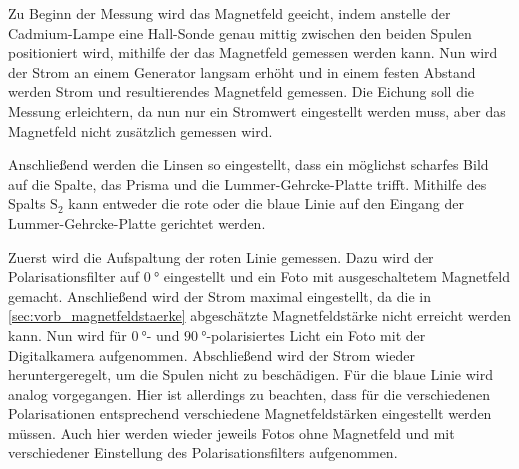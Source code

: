 Zu Beginn der Messung wird das Magnetfeld geeicht,
indem anstelle der Cadmium-Lampe eine Hall-Sonde genau mittig zwischen den beiden Spulen positioniert wird,
mithilfe der das Magnetfeld gemessen werden kann.
Nun wird der Strom an einem Generator langsam erhöht und in einem festen Abstand werden Strom und resultierendes Magnetfeld gemessen.
Die Eichung soll die Messung erleichtern,
da nun nur ein Stromwert eingestellt werden muss,
aber das Magnetfeld nicht zusätzlich gemessen wird.

Anschließend werden die Linsen so eingestellt,
dass ein möglichst scharfes Bild auf die Spalte, das Prisma und die Lummer-Gehrcke-Platte trifft.
Mithilfe des Spalts $\mathrm{S_2}$ kann entweder die rote oder die blaue Linie auf den Eingang der Lummer-Gehrcke-Platte gerichtet werden.

Zuerst wird die Aufspaltung der roten Linie gemessen.
Dazu wird der Polarisationsfilter auf $\SI{0}{\degree}$ eingestellt und ein Foto mit ausgeschaltetem Magnetfeld gemacht.
Anschließend wird der Strom maximal eingestellt,
da die in \autoref{sec:vorb_magnetfeldstaerke} abgeschätzte Magnetfeldstärke nicht erreicht werden kann.
Nun wird für $\SI{0}{\degree}$- und $\SI{90}{\degree}$-polarisiertes Licht ein Foto mit der Digitalkamera aufgenommen.
Abschließend wird der Strom wieder heruntergeregelt,
um die Spulen nicht zu beschädigen.
Für die blaue Linie wird analog vorgegangen.
Hier ist allerdings zu beachten,
dass für die verschiedenen Polarisationen entsprechend verschiedene Magnetfeldstärken eingestellt werden müssen.
Auch hier werden wieder jeweils Fotos ohne Magnetfeld und mit verschiedener Einstellung des Polarisationsfilters aufgenommen.
